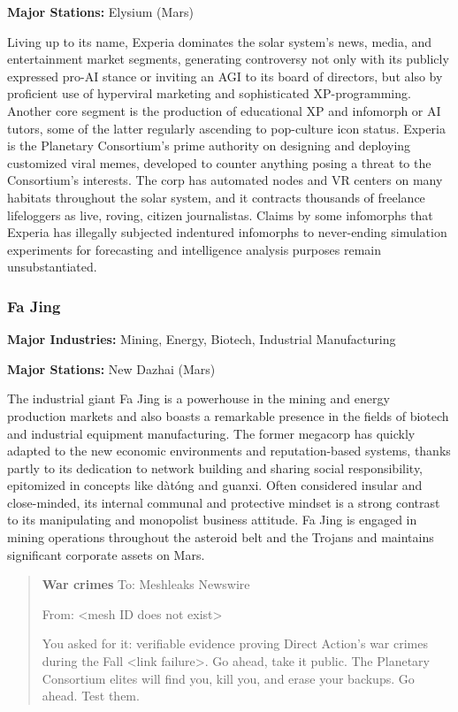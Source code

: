 \textbf{Major Stations:} Elysium (Mars) 

 Living up to its name, Experia dominates the solar system's news, media, and entertainment market segments, generating controversy not only with its publicly expressed pro-AI stance or inviting an AGI to its board of directors, but also by proficient use of hyperviral marketing and sophisticated XP-programming. Another core segment is the production of educational XP and infomorph or AI tutors, some of the latter regularly ascending to pop-culture icon status. Experia is the Planetary Consortium's prime authority on designing and deploying customized viral memes, developed to counter anything posing a threat to the Consortium's interests. The corp has automated nodes and VR centers on many habitats throughout the solar system, and it contracts thousands of freelance lifeloggers as live, roving, citizen journalistas. Claims by some infomorphs that Experia has illegally subjected indentured infomorphs to never-ending simulation experiments for forecasting and intelligence analysis purposes remain unsubstantiated. 

\subsubsection{Fa Jing}
\label{sec:fa-jing} 

\textbf{Major Industries:} Mining, Energy, Biotech, Industrial Manufacturing 

\textbf{Major Stations:} New Dazhai (Mars) 

 The industrial giant Fa Jing is a powerhouse in the mining and energy production markets and also boasts a remarkable presence in the fields of biotech and industrial equipment manufacturing. The former megacorp has quickly adapted to the new economic environments and reputation-based systems, thanks partly to its dedication to network building and sharing social responsibility, epitomized in concepts like dàtóng and guanxi. Often considered insular and close-minded, its internal communal and protective mindset is a strong contrast to its manipulating and monopolist business attitude. Fa Jing is engaged in mining operations throughout the asteroid belt and the Trojans and maintains significant corporate assets on Mars. 

\begin{quotation}
\textbf{War crimes}  To: Meshleaks Newswire 

 From: <mesh ID does not exist> 

  You asked for it: verifiable evidence proving Direct Action's war crimes during the Fall <link failure>. Go ahead, take it public. The Planetary Consortium elites will find you, kill you, and erase your backups. Go ahead. Test them.
\end{quotation} 

